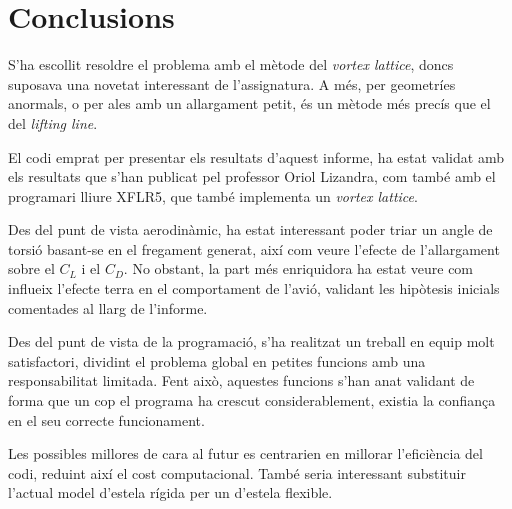 \chapter{Conclusions}

S'ha escollit resoldre el problema amb el mètode del \textit{vortex lattice}, doncs suposava una novetat interessant de l'assignatura. A més, per geometríes anormals, o per ales amb un allargament petit, és un mètode més precís que el del \textit{lifting line}. 

El codi emprat per presentar els resultats d'aquest informe, ha estat validat amb els resultats que s'han publicat pel professor Oriol Lizandra, com també amb el programari lliure XFLR5, que també implementa un \textit{vortex lattice}.

Des del punt de vista aerodinàmic, ha estat interessant poder triar un angle de torsió basant-se en el fregament generat, així com veure l'efecte de l'allargament sobre el $C_L$ i el $C_D$. No obstant, la part més enriquidora ha estat veure com influeix l'efecte terra en el comportament de l'avió, validant les hipòtesis inicials comentades al llarg de l'informe.

Des del punt de vista de la programació, s'ha realitzat un treball en equip molt satisfactori, dividint el problema global en petites funcions amb una responsabilitat limitada. Fent això, aquestes funcions s'han anat validant de forma que un cop el programa ha crescut considerablement, existia la confiança en el seu correcte funcionament.

Les possibles millores de cara al futur es centrarien en millorar l'eficiència del codi, reduint així el cost computacional. També seria interessant substituir l'actual model d'estela rígida per un d'estela flexible.
